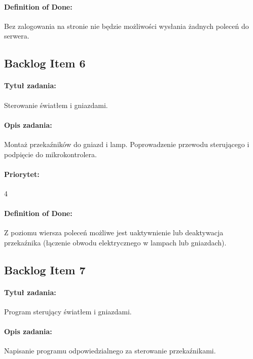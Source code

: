 \paragraph{Definition of Done:}
Bez zalogowania na stronie nie będzie możliwości wysłania żadnych poleceń do serwera.

	
	\subsection{Backlog Item 6}
	\paragraph{Tytuł zadania:} 
	Sterowanie światłem i gniazdami.
	
	\paragraph{Opis zadania:} 
	Montaż przekaźników do gniazd i lamp. Poprowadzenie przewodu sterującego i podpięcie do mikrokontrolera.
	
	\paragraph{Priorytet:}
	4
	
	\paragraph{Definition of Done:}
	Z poziomu wiersza poleceń możliwe jest uaktywnienie lub deaktywacja przekaźnika (łączenie obwodu elektrycznego w lampach lub gniazdach).


\subsection{Backlog Item 7}
\paragraph{Tytuł zadania:} 
Program sterujący światłem i gniazdami.

\paragraph{Opis zadania:} 
Napisanie programu odpowiedzialnego za sterowanie przekaźnikami.

